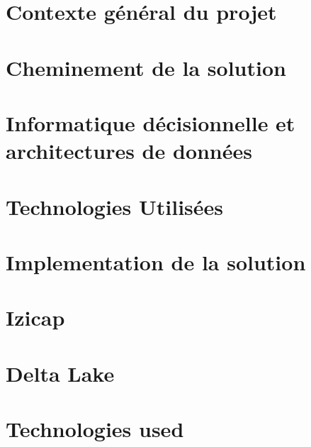 \documentclass{iid}
\begin{document}
\ifnum{}
    \chapter{Contexte général du projet}\label{chap:1}
    \minitoc
    
    \chapter{Cheminement de la solution}\label{chap:2}
    
    
    \chapter{Informatique décisionnelle et architectures de données}\label{chap:3}
    

    \chapter{Technologies Utilisées}\label{chap:4}
    

    \chapter{Implementation de la solution}\label{chap:5}
    

\else
    \chapter{Izicap}\label{chap:1}
    \minitoc
    
    \chapter{Delta Lake}\label{chap:2}
    
    
    \chapter{Technologies used}\label{chap:3}

    
\fi
 
% 

% 
\lhead[]{} \rhead[]{} \chead[]{}

% 
% 


%
\end{document}
